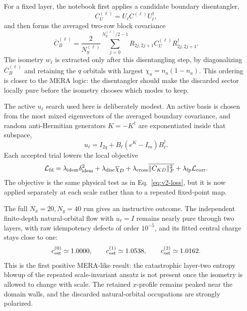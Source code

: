 \documentclass[aps,prb,twocolumn,floatfix]{revtex4-2}
\begin{document}
For a fixed layer, the notebook first applies a candidate boundary
disentangler,
\begin{equation}
  C_U^{(\ell)}=U_\ell C^{(\ell)}U_\ell^\dagger ,
\end{equation}
and then forms the averaged two-row block covariance
\begin{equation}
  \overline{C}_{B}^{(\ell)}
  =
  \frac{2}{N_y^{(\ell)}}\sum_{j=0}^{N_y^{(\ell)}/2-1}
  R_{2j,2j+1}C_U^{(\ell)}R_{2j,2j+1}^\dagger .
\end{equation}
The isometry \(w_\ell\) is extracted only after this disentangling step, by
diagonalizing \(\overline{C}_B^{(\ell)}\) and retaining the \(q\) orbitals with
largest \(\chi_a=n_a(1-n_a)\).  This ordering is closer to the MERA logic:
the disentangler should make the discarded sector locally pure before the
isometry chooses which modes to keep.

The active \(u_\ell\) search used here is deliberately modest.  An active basis
is chosen from the most mixed eigenvectors of the averaged boundary covariance,
and random anti-Hermitian generators \(K=-K^\dagger\) are exponentiated inside
that subspace,
\begin{equation}
  u_\ell
  =
  I_{2q}
  +B_\ell\left(e^K-I_m\right)B_\ell^\dagger .
\end{equation}
Each accepted trial lowers the local objective
\begin{equation}
  \mathcal{L}_{\rm fd}
  =
  \lambda_{\rm idem}\delta_{\rm idem}^2
  +\lambda_{\rm disc}\overline{\chi}_{D}
  +\lambda_{\rm cross}\overline{\|C_{KD}\|_F^2}
  +\lambda_{\rm fp}\mathcal{L}_{\rm corr}.
  \label{eq:finite-depth-loss}
\end{equation}
The objective is the same physical test as in Eq.~\eqref{eq:v2-loss}, but it
is now applied separately at each scale rather than to a repeated fixed-point
map.

The full \(N_x=20,N_y=40\) run gives an instructive outcome.  The independent
finite-depth natural-orbital flow with \(u_\ell=I\) remains nearly pure through
two layers, with raw idempotency defects of order \(10^{-5}\), and its fitted
central charge stays close to one:
\begin{equation}
  c_{\rm est}^{(0)}\simeq1.0000,\qquad
  c_{\rm est}^{(1)}\simeq1.0538,\qquad
  c_{\rm est}^{(2)}\simeq1.0162 .
\end{equation}
This is the first positive MERA-like result: the catastrophic layer-two
entropy blowup of the repeated scale-invariant ansatz is not present once the
isometry is allowed to change with scale.  The retained \(x\)-profile remains
peaked near the domain walls, and the discarded natural-orbital occupations
are strongly polarized.
\end{document}
